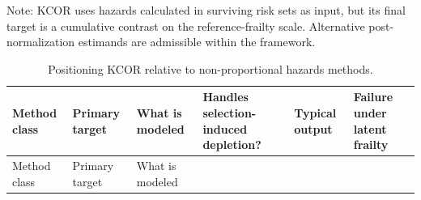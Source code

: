 \documentclass[
]{article}
\begin{document}
Note: KCOR uses hazards calculated in surviving risk sets as input, but its final target is a cumulative contrast on the reference-frailty scale. Alternative post-normalization estimands are admissible within the framework.

\newpage

\begin{longtable}[]{@{}
  >{\raggedright\arraybackslash}p{}
  >{\raggedright\arraybackslash}p{}
  >{\raggedright\arraybackslash}p{}
  >{\raggedright\arraybackslash}p{}
  >{\raggedright\arraybackslash}p{}
  >{\raggedright\arraybackslash}p{}@{}}
\caption{Positioning KCOR relative to non-proportional hazards methods.}\label{tbl:positioning}\tabularnewline
\toprule\noalign{}
\begin{minipage}[b]{\linewidth}\raggedright
Method class
\end{minipage} & \begin{minipage}[b]{\linewidth}\raggedright
Primary target
\end{minipage} & \begin{minipage}[b]{\linewidth}\raggedright
What is modeled
\end{minipage} & \begin{minipage}[b]{\linewidth}\raggedright
Handles selection-induced depletion?
\end{minipage} & \begin{minipage}[b]{\linewidth}\raggedright
Typical output
\end{minipage} & \begin{minipage}[b]{\linewidth}\raggedright
Failure under latent frailty
\end{minipage} \\
\midrule\noalign{}
\endfirsthead
\toprule\noalign{}
\begin{minipage}[b]{\linewidth}\raggedright
Method class
\end{minipage} & \begin{minipage}[b]{\linewidth}\raggedright
Primary target
\end{minipage} & \begin{minipage}[b]{\linewidth}\raggedright
What is modeled
\end{minipage} & \begin{minipage}[b]{\linewidth}\raggedright

\end{minipage}
\end{longtable}
\end{document}

